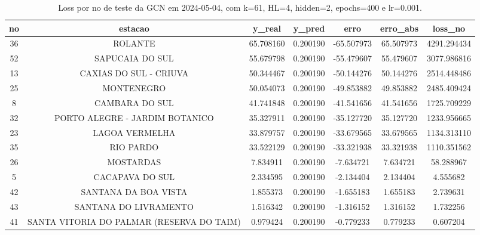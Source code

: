 \begin{table}[h]
\centering
\caption{Loss por no de teste da GCN em 2024-05-04, com k=61, HL=4, hidden=2, epochs=400 e lr=0.001.}
\label{tab:gcn_loss_k61_hl4_h2_e400_d20240504}
\begin{tabular}{ccccccc}
\toprule
no & estacao & y\_real & y\_pred & erro & erro\_abs & loss\_no \\
\midrule
36 & ROLANTE & 65.708160 & 0.200190 & -65.507973 & 65.507973 & 4291.294434 \\
52 & SAPUCAIA DO SUL & 55.679798 & 0.200190 & -55.479607 & 55.479607 & 3077.986816 \\
13 & CAXIAS DO SUL - CRIUVA & 50.344467 & 0.200190 & -50.144276 & 50.144276 & 2514.448486 \\
25 & MONTENEGRO & 50.054073 & 0.200190 & -49.853882 & 49.853882 & 2485.409424 \\
8 & CAMBARA DO SUL & 41.741848 & 0.200190 & -41.541656 & 41.541656 & 1725.709229 \\
32 & PORTO ALEGRE - JARDIM BOTANICO & 35.327911 & 0.200190 & -35.127720 & 35.127720 & 1233.956665 \\
23 & LAGOA VERMELHA & 33.879757 & 0.200190 & -33.679565 & 33.679565 & 1134.313110 \\
35 & RIO PARDO & 33.522129 & 0.200190 & -33.321938 & 33.321938 & 1110.351562 \\
26 & MOSTARDAS & 7.834911 & 0.200190 & -7.634721 & 7.634721 & 58.288967 \\
5 & CACAPAVA DO SUL & 2.334595 & 0.200190 & -2.134404 & 2.134404 & 4.555682 \\
42 & SANTANA DA BOA VISTA & 1.855373 & 0.200190 & -1.655183 & 1.655183 & 2.739631 \\
43 & SANTANA DO LIVRAMENTO & 1.516342 & 0.200190 & -1.316152 & 1.316152 & 1.732256 \\
41 & SANTA VITORIA DO PALMAR (RESERVA DO TAIM) & 0.979424 & 0.200190 & -0.779233 & 0.779233 & 0.607204 \\
\bottomrule
\end{tabular}
\end{table}
